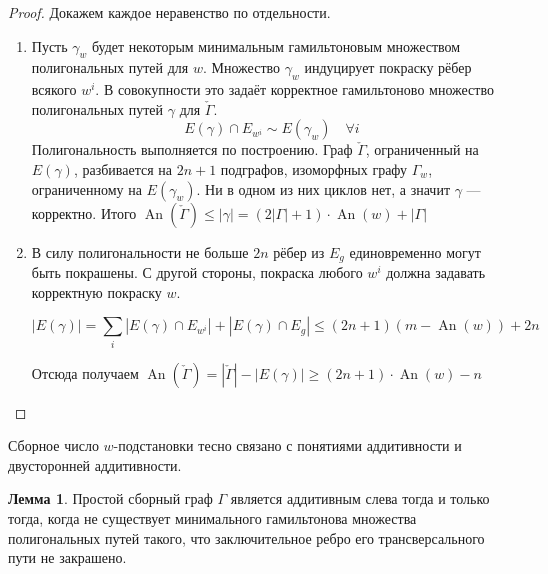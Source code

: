 \documentclass{article}
\theoremstyle{definition}
\newtheorem{lemma}[theorem]{Лемма}
\newcommand{\An}{\operatorname{An}}
\begin{document}
\begin{proof}
    Докажем каждое неравенство по отдельности.

    \begin{enumerate} 
        \item Пусть $\gamma_w$ будет некоторым минимальным гамильтоновым множеством полигональных путей для $w$. Множество $\gamma_w$ индуцирует покраску рёбер всякого $w^i$. В совокупности это задаёт корректное гамильтоново множество полигональных путей $\gamma$ для $\check{\Gamma}$. 
        \[ 
        E(\gamma) \cap E_{w^i} \sim E(\gamma_w) \quad \forall i 
        \]
        Полигональность выполняется по построению. Граф $\check{\Gamma}$, ограниченный на $E(\gamma)$, разбивается на $2n + 1$ подграфов, изоморфных графу $\Gamma_w$, ограниченному на $E(\gamma_w)$. Ни в одном из них циклов нет, а значит $\gamma$ — корректно. Итого $\An(\check{\Gamma}) \leq |\gamma| = (2|\Gamma| + 1) \cdot \An(w) + |\Gamma|$

        \item В силу полигональности не больше $2n$ рёбер из $E_g$ единовременно могут быть покрашены. С другой стороны, покраска любого $w^i$ должна задавать корректную покраску $w$. 

        \[
        |E(\gamma)| = \sum_i|E(\gamma)\cap E_{w^i}| + |E(\gamma) \cap E_g| \leq (2n + 1)(m - \An(w)) + 2n
        \]
        
        Отсюда получаем $\An(\check{\Gamma}) = |\check{\Gamma}| - |E(\gamma)| \geq (2n + 1)\cdot \An(w) - n$

    \end{enumerate}
\end{proof}

Сборное число $w$-подстановки тесно связано с понятиями аддитивности и двусторонней аддитивности. 

\begin{lemma}\label{lemma:left-additive}
    Простой сборный граф $\Gamma$ является аддитивным слева тогда и только тогда, когда не существует минимального гамильтонова множества полигональных путей такого, что заключительное ребро его трансверсального пути не закрашено.
\end{lemma}
\end{document}
